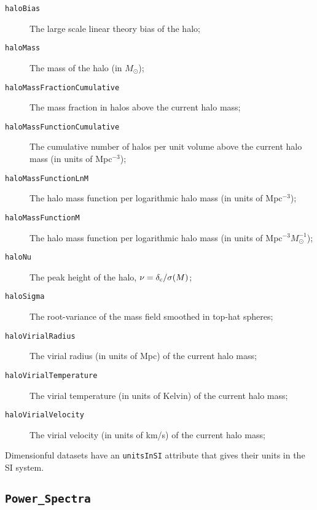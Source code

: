 \begin{description}
\item [{\tt haloBias}] The large scale linear theory bias of the halo;
\item [{\tt haloMass}] The mass of the halo (in $M_\odot$);
\item [{\tt haloMassFractionCumulative}] The mass fraction in halos above the current halo mass;
\item [{\tt haloMassFunctionCumulative}] The cumulative number of halos per unit volume above the current halo mass (in units of Mpc$^{-3}$);
\item [{\tt haloMassFunctionLnM}] The halo mass function per logarithmic halo mass (in units of Mpc$^{-3}$);
\item [{\tt haloMassFunctionM}] The halo mass function per logarithmic halo mass (in units of Mpc$^{-3} M_\odot^{-1}$);
\item [{\tt haloNu}] The peak height of the halo, $\nu = \delta_{\rm c}/\sigma(M)$;
\item [{\tt haloSigma}] The root-variance of the mass field smoothed in top-hat spheres;
\item [{\tt haloVirialRadius}] The virial radius (in units of Mpc) of the current halo mass;
\item [{\tt haloVirialTemperature}] The virial temperature (in units of Kelvin) of the current halo mass;
\item [{\tt haloVirialVelocity}] The virial velocity (in units of km/s) of the current halo mass;
\end{description}
Dimensionful datasets have an {\tt unitsInSI} attribute that gives their units in the SI system.

\subsection{{\tt Power\_Spectra}}

